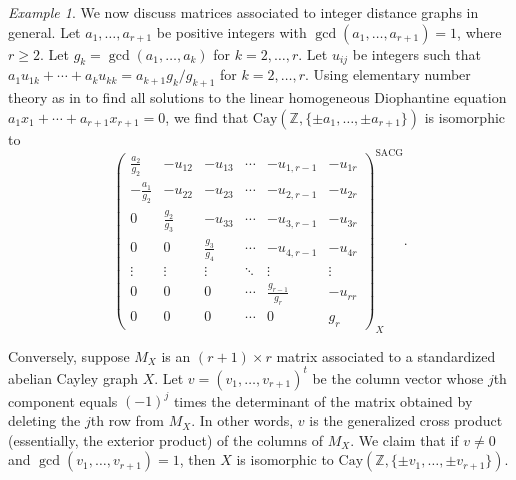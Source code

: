 \documentclass{article}
\theoremstyle{definition}
\theoremstyle{remark}
\newtheorem{Ex}[Thm]{Example}
\begin{document}
\vspace{.1in}

\begin{Ex}\label{example-arbitrary-distance-graph} We now discuss matrices associated to integer distance graphs in general.  Let $a_1,\dots,a_{r+1}$ be positive integers with $\gcd(a_1,\dots,a_{r+1})=1$, where $r\geq 2$.  Let $g_k=\gcd(a_1,\dots,a_k)$ for $k=2,\dots,r$.  Let $u_{ij}$ be integers such that $a_1u_{1k}+\cdots+a_ku_{kk}=a_{k+1}g_k/g_{k+1}$ for $k=2,\dots, r$.  Using elementary number theory as in \cite{Pommersheim} to find all solutions to the linear homogeneous Diophantine equation 
$a_1 x_1+\cdots+a_{r+1} x_{r+1}=0$, we find that $\text{Cay}(\mathbb{Z},\{\pm a_1,\dots,\pm a_{r+1}\})$ is isomorphic to \[\begin{pmatrix}
\frac{a_2}{g_2} & -u_{12} & -u_{13} & \cdots & -u_{1,r-1} & -u_{1r}\\
-\frac{a_1}{g_2} & -u_{22} & -u_{23} & \cdots & -u_{2,r-1} & -u_{2r}\\
0 & \frac{g_2}{g_3} & -u_{33} & \cdots & -u_{3,r-1} & -u_{3r}\\
0 & 0 & \frac{g_3}{g_4} & \cdots & -u_{4,r-1} & -u_{4r}\\
\vdots & \vdots & \vdots & \ddots & \vdots & \vdots\\
0 & 0 & 0 & \cdots &  \frac{g_{r-1}}{g_r} & -u_{rr}\\
0 & 0 & 0 & \cdots & 0 & g_r
\end{pmatrix}^{\text{SACG}}_X.\]

Conversely, suppose $M_X$ is an $(r+1)\times r$ matrix associated to a standardized abelian Cayley graph $X$.  Let $v=(v_1,\dots,v_{r+1})^t$ be the column vector whose $j$th component equals $(-1)^j$ times the determinant of the matrix obtained by deleting the $j$th row from $M_X$.  In other words, $v$ is the generalized cross product (essentially, the exterior product) of the columns of $M_X$.  We claim that if $v\neq 0$ and $\gcd(v_1,\dots,v_{r+1})=1$, then $X$ is isomorphic to $\text{Cay}(\mathbb{Z},\{\pm v_1,\dots,\pm v_{r+1}\})$.


\end{Ex}
\end{document}
